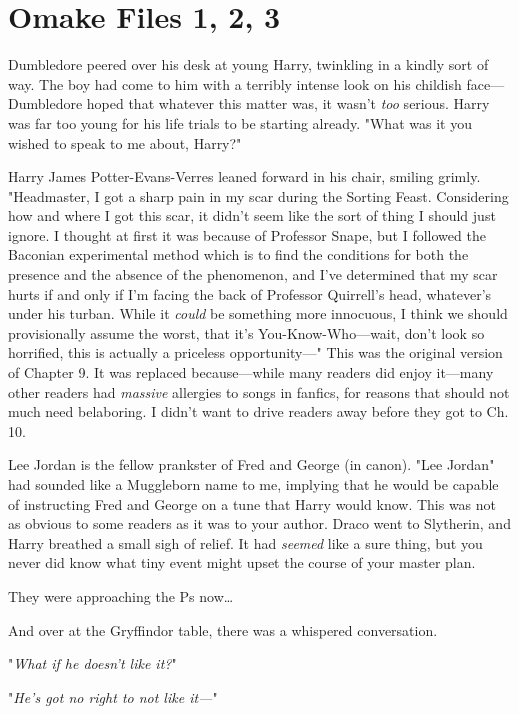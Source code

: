\chapter{Omake Files 1, 2, 3}

Dumbledore peered over his desk at young Harry, twinkling in a kindly sort of 
way. The boy had come to him with a terribly intense look on his childish 
face---Dumbledore hoped that whatever this matter was, it wasn't \emph{too} 
serious. Harry was far too young for his life trials to be starting already. 
"What was it you wished to speak to me about, Harry?"

Harry James Potter-Evans-Verres leaned forward in his chair, smiling grimly. 
"Headmaster, I got a sharp pain in my scar during the Sorting Feast. 
Considering how and where I got this scar, it didn't seem like the sort of 
thing I should just ignore. I thought at first it was because of Professor 
Snape, but I followed the Baconian experimental method which is to find the 
conditions for both the presence and the absence of the phenomenon, and I've 
determined that my scar hurts if and only if I'm facing the back of Professor 
Quirrell's head, whatever's under his turban. While it \emph{could} be 
something more innocuous, I think we should provisionally assume the worst, 
that it's You-Know-Who---wait, don't look so horrified, this is actually a 
priceless opportunity---"
\sbreak
This was the original version of Chapter 9. It was replaced because---while 
many readers did enjoy it---many other readers had \emph{massive} allergies to 
songs in fanfics, for reasons that should not much need belaboring. I didn't 
want to drive readers away before they got to Ch. 10.

Lee Jordan is the fellow prankster of Fred and George (in canon). "Lee Jordan" 
had sounded like a Muggleborn name to me, implying that he would be capable of 
instructing Fred and George on a tune that Harry would know. This was not as 
obvious to some readers as it was to your author.
\sbreak
Draco went to Slytherin, and Harry breathed a small sigh of relief. It had 
\emph{seemed} like a sure thing, but you never did know what tiny event might 
upset the course of your master plan.

They were approaching the Ps now{\ldots}

And over at the Gryffindor table, there was a whispered conversation.

"\emph{What if he doesn't like it?}"

"\emph{He's got no right to not like it---}"

